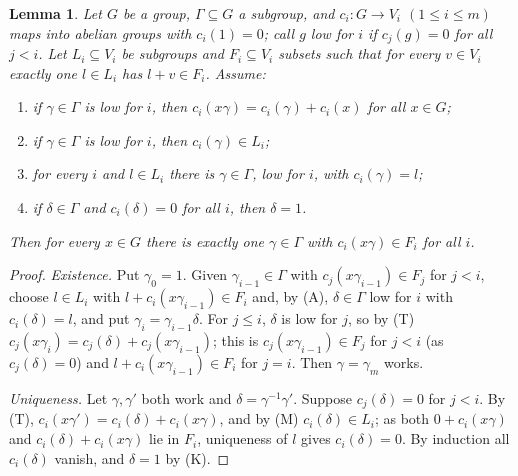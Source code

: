 \documentclass[10pt]{amsart}
\newtheorem{lemma}[theorem]{Lemma}
\theoremstyle{definition}
\theoremstyle{remark}
\begin{document}
\begin{lemma}\label{pbv:box}
Let $G$ be a group, $\Gamma\subseteq G$ a subgroup, and $c_i\colon G\to V_i$ $(1\le i\le m)$ maps into abelian
groups with $c_i(1)=0$; call $g$ \emph{low for $i$} if $c_j(g)=0$ for all $j<i$. Let $L_i\subseteq V_i$ be
subgroups and $F_i\subseteq V_i$ subsets such that for every $v\in V_i$ exactly one $l\in L_i$ has $l+v\in
F_i$. Assume:
\begin{enumerate}
\item[(T)] if $\gamma\in\Gamma$ is low for $i$, then $c_i(x\gamma)=c_i(\gamma)+c_i(x)$ for all $x\in G$;
\item[(M)] if $\gamma\in\Gamma$ is low for $i$, then $c_i(\gamma)\in L_i$;
\item[(A)] for every $i$ and $l\in L_i$ there is $\gamma\in\Gamma$, low for $i$, with $c_i(\gamma)=l$;
\item[(K)] if $\delta\in\Gamma$ and $c_i(\delta)=0$ for all $i$, then $\delta=1$.
\end{enumerate}
Then for every $x\in G$ there is exactly one $\gamma\in\Gamma$ with $c_i(x\gamma)\in F_i$ for all $i$.
\end{lemma}
\begin{proof}
\emph{Existence.} Put $\gamma_0=1$. Given $\gamma_{i-1}\in\Gamma$ with $c_j(x\gamma_{i-1})\in F_j$ for $j<i$,
choose $l\in L_i$ with $l+c_i(x\gamma_{i-1})\in F_i$ and, by (A), $\delta\in\Gamma$ low for $i$ with
$c_i(\delta)=l$, and put $\gamma_i=\gamma_{i-1}\delta$. For $j\le i$, $\delta$ is low for $j$, so by (T)
$c_j(x\gamma_i)=c_j(\delta)+c_j(x\gamma_{i-1})$; this is $c_j(x\gamma_{i-1})\in F_j$ for $j<i$ (as
$c_j(\delta)=0$) and $l+c_i(x\gamma_{i-1})\in F_i$ for $j=i$. Then $\gamma=\gamma_m$ works.

\emph{Uniqueness.} Let $\gamma,\gamma'$ both work and $\delta=\gamma^{-1}\gamma'$. Suppose $c_j(\delta)=0$ for
$j<i$. By (T), $c_i(x\gamma')=c_i(\delta)+c_i(x\gamma)$, and by (M) $c_i(\delta)\in L_i$; as both
$0+c_i(x\gamma)$ and $c_i(\delta)+c_i(x\gamma)$ lie in $F_i$, uniqueness of $l$ gives $c_i(\delta)=0$. By
induction all $c_i(\delta)$ vanish, and $\delta=1$ by (K).
\end{proof}
\end{document}
